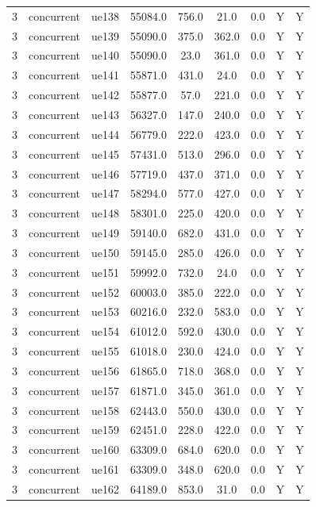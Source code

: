 \begin{table}[ht]
\begin{tabular}{|c|c|c|c|c|c|c|c|c|}
3 & concurrent & ue138 & 55084.0 & 756.0 & 21.0 & 0.0 & Y & Y \\
3 & concurrent & ue139 & 55090.0 & 375.0 & 362.0 & 0.0 & Y & Y \\
3 & concurrent & ue140 & 55090.0 & 23.0 & 361.0 & 0.0 & Y & Y \\
3 & concurrent & ue141 & 55871.0 & 431.0 & 24.0 & 0.0 & Y & Y \\
3 & concurrent & ue142 & 55877.0 & 57.0 & 221.0 & 0.0 & Y & Y \\
3 & concurrent & ue143 & 56327.0 & 147.0 & 240.0 & 0.0 & Y & Y \\
3 & concurrent & ue144 & 56779.0 & 222.0 & 423.0 & 0.0 & Y & Y \\
3 & concurrent & ue145 & 57431.0 & 513.0 & 296.0 & 0.0 & Y & Y \\
3 & concurrent & ue146 & 57719.0 & 437.0 & 371.0 & 0.0 & Y & Y \\
3 & concurrent & ue147 & 58294.0 & 577.0 & 427.0 & 0.0 & Y & Y \\
3 & concurrent & ue148 & 58301.0 & 225.0 & 420.0 & 0.0 & Y & Y \\
3 & concurrent & ue149 & 59140.0 & 682.0 & 431.0 & 0.0 & Y & Y \\
3 & concurrent & ue150 & 59145.0 & 285.0 & 426.0 & 0.0 & Y & Y \\
3 & concurrent & ue151 & 59992.0 & 732.0 & 24.0 & 0.0 & Y & Y \\
3 & concurrent & ue152 & 60003.0 & 385.0 & 222.0 & 0.0 & Y & Y \\
3 & concurrent & ue153 & 60216.0 & 232.0 & 583.0 & 0.0 & Y & Y \\
3 & concurrent & ue154 & 61012.0 & 592.0 & 430.0 & 0.0 & Y & Y \\
3 & concurrent & ue155 & 61018.0 & 230.0 & 424.0 & 0.0 & Y & Y \\
3 & concurrent & ue156 & 61865.0 & 718.0 & 368.0 & 0.0 & Y & Y \\
3 & concurrent & ue157 & 61871.0 & 345.0 & 361.0 & 0.0 & Y & Y \\
3 & concurrent & ue158 & 62443.0 & 550.0 & 430.0 & 0.0 & Y & Y \\
3 & concurrent & ue159 & 62451.0 & 228.0 & 422.0 & 0.0 & Y & Y \\
3 & concurrent & ue160 & 63309.0 & 684.0 & 620.0 & 0.0 & Y & Y \\
3 & concurrent & ue161 & 63309.0 & 348.0 & 620.0 & 0.0 & Y & Y \\
3 & concurrent & ue162 & 64189.0 & 853.0 & 31.0 & 0.0 & Y & Y \\

\end{tabular}
\end{table}
